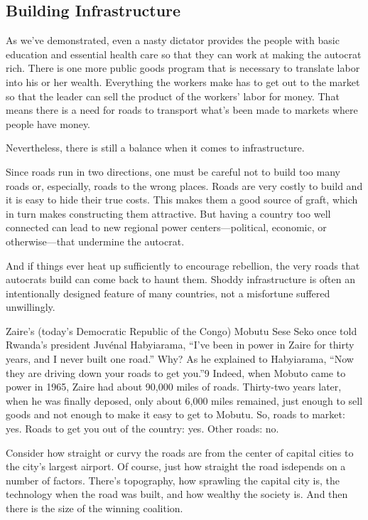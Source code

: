 \documentclass[10pt]{article}
\begin{document}
\subsection{Building Infrastructure}

{\large As we've demonstrated, even a nasty dictator provides the people with
basic education and essential health care so that they can work at making the
autocrat rich. There is one more public goods program that is necessary to
translate labor into his or her wealth. Everything the workers make has to get
out to the market so that the leader can sell the product of the workers' labor
for money. That means there is a need for roads to transport what's been made to
markets where people have money.}

{\large Nevertheless, there is still a balance when it comes to infrastructure.}

{\large Since roads run in two directions, one must be careful not to build too
many roads or, especially, roads to the wrong places. Roads are very costly to
build and it is easy to hide their true costs. This makes them a good source of
graft, which in turn makes constructing them attractive. But having a country too
well connected can lead to new regional power centers---political, economic, or
otherwise---that undermine the autocrat.}

{\large And if things ever heat up sufficiently to encourage rebellion, the very
roads that autocrats build can come back to haunt them. Shoddy infrastructure is
often an intentionally designed feature of many countries, not a misfortune
suffered unwillingly.}

{\large Zaire's (today's Democratic Republic of the Congo) Mobutu Sese Seko once
told Rwanda's president Juv\'{e}nal Habyiarama, ``I've been in power in Zaire for
thirty years, and I never built one road.'' Why? As he explained to Habyiarama,
``Now they are driving down your roads to get you.''9 Indeed, when Mobuto came to
power in 1965, Zaire had about 90,000 miles of roads. Thirty-two years later,
when he was finally deposed, only about 6,000 miles remained, just enough to sell
goods and not enough to make it easy to get to Mobutu. So, roads to market: yes.
Roads to get you out of the country: yes. Other roads: no.}

{\large Consider how straight or curvy the roads are from the center of capital
cities to the city's largest airport. Of course, just how straight the road
isdepends on a number of factors. There's topography, how sprawling the capital
city is, the technology when the road was built, and how wealthy the society is.
And then there is the size of the winning coalition.}
\end{document}
